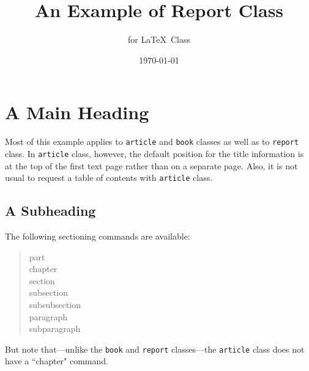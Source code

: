 \documentclass[11pt]{report}            %
\title{\bf An Example of Report Class}  %
\author{for \LaTeX\ Class}              %
\date{\today}                           %
\begin{document}
\maketitle                              %
\setcounter{page}{2}                    %
\tableofcontents                        %

\chapter{A Main Heading}                %
Most of this example applies to \texttt{article} and \texttt{book} classes
as well as to \texttt{report} class. In \texttt{article} class, however,
the default position for the title information is at the top of
the first text page rather than on a separate page. Also, it is
not usual to request a table of contents with \texttt{article} class.
 
\section{A Subheading}                  %
The following sectioning commands are available:
\begin{quote}                           %
 part \\                                %
 chapter \\                             %
 section \\ 
 subsection \\ 
 subsubsection \\ 
 paragraph \\ 
 subparagraph 
\end{quote}                             %
But note that---unlike the \texttt{book} and \texttt{report} classes---the
\texttt{article} class does not have a ``chapter" command.
 
\end{document}
